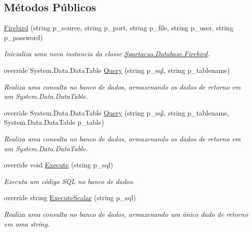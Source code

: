 \subsection*{Métodos Públicos}
\begin{DoxyCompactItemize}
\item 
\hyperlink{classSpartacus_1_1Database_1_1Firebird_ad561c2ad372a44fc785238e72dbc10b4}{Firebird} (string p\+\_\+source, string p\+\_\+port, string p\+\_\+file, string p\+\_\+user, string p\+\_\+password)
\begin{DoxyCompactList}\small\item\em Inicializa uma nova instancia da classe \hyperlink{classSpartacus_1_1Database_1_1Firebird}{Spartacus.\+Database.\+Firebird}. \end{DoxyCompactList}\item 
override System.\+Data.\+Data\+Table \hyperlink{classSpartacus_1_1Database_1_1Firebird_a10235140b612dd5b178169461962d2df}{Query} (string p\+\_\+sql, string p\+\_\+tablename)
\begin{DoxyCompactList}\small\item\em Realiza uma consulta no banco de dados, armazenando os dados de retorno em um System.\+Data.\+Data\+Table. \end{DoxyCompactList}\item 
override System.\+Data.\+Data\+Table \hyperlink{classSpartacus_1_1Database_1_1Firebird_a6243d18345e2b5f44ddcda032f6b2b9e}{Query} (string p\+\_\+sql, string p\+\_\+tablename, System.\+Data.\+Data\+Table p\+\_\+table)
\begin{DoxyCompactList}\small\item\em Realiza uma consulta no banco de dados, armazenando os dados de retorno em um System.\+Data.\+Data\+Table. \end{DoxyCompactList}\item 
override void \hyperlink{classSpartacus_1_1Database_1_1Firebird_a1844a94a27db40450a91a1d415a9d456}{Execute} (string p\+\_\+sql)
\begin{DoxyCompactList}\small\item\em Executa um código S\+Q\+L no banco de dados. \end{DoxyCompactList}\item 
override string \hyperlink{classSpartacus_1_1Database_1_1Firebird_ab785abbc3e5f8b989c10c3a771981a83}{Execute\+Scalar} (string p\+\_\+sql)
\begin{DoxyCompactList}\small\item\em Realiza uma consulta no banco de dados, armazenando um único dado de retorno em uma string. \end{DoxyCompactList}\end{DoxyCompactItemize}
